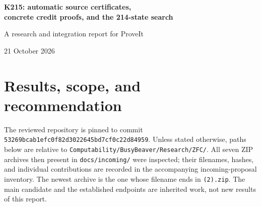 \documentclass[11pt]{article}
\theoremstyle{definition}\newtheorem{definition}[theorem]{Definition}
\begin{document}
\begin{center}
{\Large\bfseries\color{navy} K215: automatic source certificates,\\[3pt]
concrete credit proofs, and the 214-state search}\par
\vspace{8pt}
{\large A research and integration report for ProveIt}\par
21 October 2026
\end{center}

\begin{abstract}
The current 215-state machine already has checked Lean and Rocq correctness
endpoints. The useful next step is therefore to preserve that calibration and
remove repeated source-correspondence and enumeration arguments. This report
reviews all seven pending proposal archives, supplies a new Rocq-compatible
normalized source checker with an exact all-register theorem, implements
automatic correspondence inference in Lean from the two literal decoder trees,
and proves the concrete zero-credit scheduler theorem for the existing ZC215
codec. The first construction reduces the source relation from 2,240 entries to
1,426. The second removes a separately maintained correspondence input by
synthesizing a cache and checking it against the source trees. The third discharges
the actual codec, parser, monotonicity, and injectivity assumptions behind the
previous abstract credit argument. A separate predecessor-specific state
elimination search and a targeted scanner repair search did not construct a
verified 214-state machine. Their finite scope is recorded explicitly.
\end{abstract}

\section{Results, scope, and recommendation}

The reviewed repository is pinned to commit
\texttt{53269bcab1efc0f82d3022645bd7cf0c22d84959}.
Unless stated otherwise, paths below are relative to
\texttt{Computability/BusyBeaver/Research/ZFC/}.
All seven ZIP archives then present in \texttt{docs/incoming/} were inspected;
their filenames, hashes, and individual contributions are recorded in the
accompanying incoming-proposal inventory. The newest archive is the one whose
filename ends in \texttt{(2).zip}. The main candidate and the established
endpoints are inherited work, not new results of this report.\cite{verification,incoming}
\end{document}
